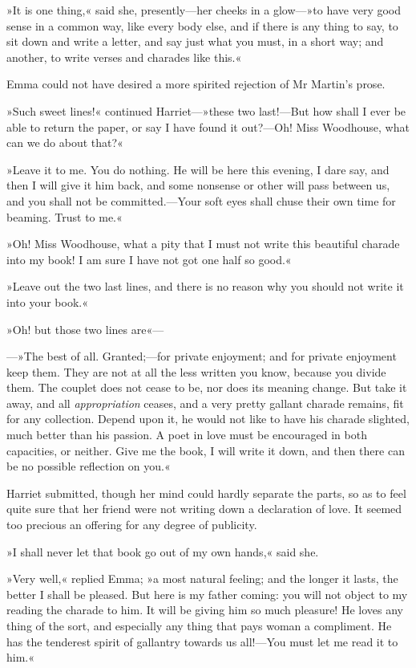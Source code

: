»It is one thing,« said she, presently—her cheeks in a glow—»to have very good sense in a common way, like every body else, and if there is any thing to say, to sit down and write a letter, and say just what you must, in a short way; and another, to write verses and charades like this.«

Emma could not have desired a more spirited rejection of Mr Martin's prose.

»Such sweet lines!« continued Harriet—»these two last!—But how shall I ever be able to return the paper, or say I have found it out?—Oh! Miss Woodhouse, what can we do about that?«

»Leave it to me. You do nothing. He will be here this evening, I dare say, and then I will give it him back, and some nonsense or other will pass between us, and you shall not be committed.—Your soft eyes shall chuse their own time for beaming. Trust to me.«

»Oh! Miss Woodhouse, what a pity that I must not write this beautiful charade into my book! I am sure I have not got one half so good.«

»Leave out the two last lines, and there is no reason why you should not write it into your book.«

»Oh! but those two lines are«—

—»The best of all. Granted;—for private enjoyment; and for private enjoyment keep them. They are not at all the less written you know, because you divide them. The couplet does not cease to be, nor does its meaning change. But take it away, and all \textit{appropriation} ceases, and a very pretty gallant charade remains, fit for any collection. Depend upon it, he would not like to have his charade slighted, much better than his passion. A poet in love must be encouraged in both capacities, or neither. Give me the book, I will write it down, and then there can be no possible reflection on you.«

Harriet submitted, though her mind could hardly separate the parts, so as to feel quite sure that her friend were not writing down a declaration of love. It seemed too precious an offering for any degree of publicity.

»I shall never let that book go out of my own hands,« said she.

»Very well,« replied Emma; »a most natural feeling; and the longer it lasts, the better I shall be pleased. But here is my father coming: you will not object to my reading the charade to him. It will be giving him so much pleasure! He loves any thing of the sort, and especially any thing that pays woman a compliment. He has the tenderest spirit of gallantry towards us all!—You must let me read it to him.«

